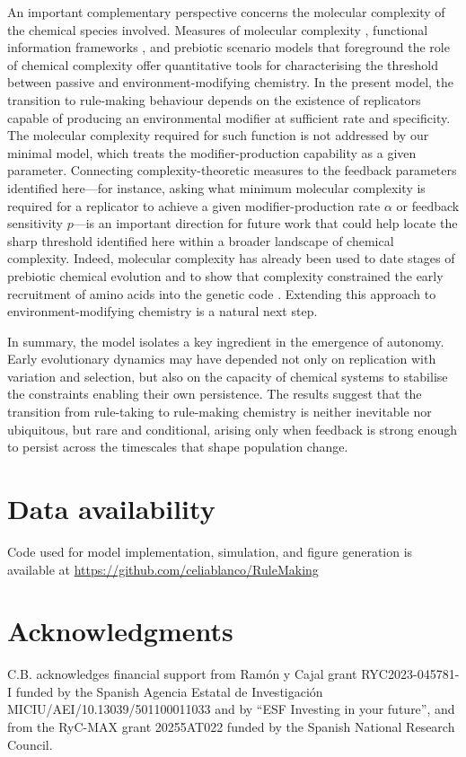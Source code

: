 \documentclass[11pt]{article}
\newcommand{\rev}[1]{#1}
\begin{document}
\rev{An important complementary perspective concerns the molecular complexity of the chemical species involved. Measures of molecular complexity \citep{Papentin1982Complexity,Bottcher2018Complexity,Bywater2012Dating,Bywater2018AminoAcids}, functional information frameworks \citep{Hazen2007Functional,Walker2013Algorithmic}, and prebiotic scenario models that foreground the role of chemical complexity \citep{Bywater2005Beach,Bywater2009Membrane} offer quantitative tools for characterising the threshold between passive and environment-modifying chemistry. In the present model, the transition to rule-making behaviour depends on the existence of replicators capable of producing an environmental modifier at sufficient rate and specificity. The molecular complexity required for such function is not addressed by our minimal model, which treats the modifier-production capability as a given parameter. Connecting complexity-theoretic measures to the feedback parameters identified here---for instance, asking what minimum molecular complexity is required for a replicator to achieve a given modifier-production rate $\alpha$ or feedback sensitivity $p$---is an important direction for future work that could help locate the sharp threshold identified here within a broader landscape of chemical complexity. Indeed, molecular complexity has already been used to date stages of prebiotic chemical evolution \citep{Bywater2012Dating} and to show that complexity constrained the early recruitment of amino acids into the genetic code \citep{Bywater2018AminoAcids,Hashmi2026Complexity}. Extending this approach to environment-modifying chemistry is a natural next step.}

In summary, the model isolates a key ingredient in the emergence of autonomy. Early evolutionary dynamics may have depended not only on replication with variation and selection, but also on the capacity of chemical systems to stabilise the constraints enabling their own persistence. The results suggest that the transition from rule-taking to rule-making chemistry is neither inevitable nor ubiquitous, but rare and conditional, arising only when feedback is strong enough to persist across the timescales that shape population change. \section*{Data availability}
Code used for model implementation, simulation, and figure generation is available at \url{https://github.com/celiablanco/RuleMaking} 
 \section*{Acknowledgments}
C.B. acknowledges financial support from Ram\'on y Cajal grant RYC2023-045781-I funded by the Spanish Agencia Estatal de Investigaci\'on MICIU/AEI/10.13039/501100011033 and by ``ESF Investing in your future'', and from the RyC-MAX grant 20255AT022 funded by the Spanish National Research Council.
 \clearpage
\appendix
\end{document}
